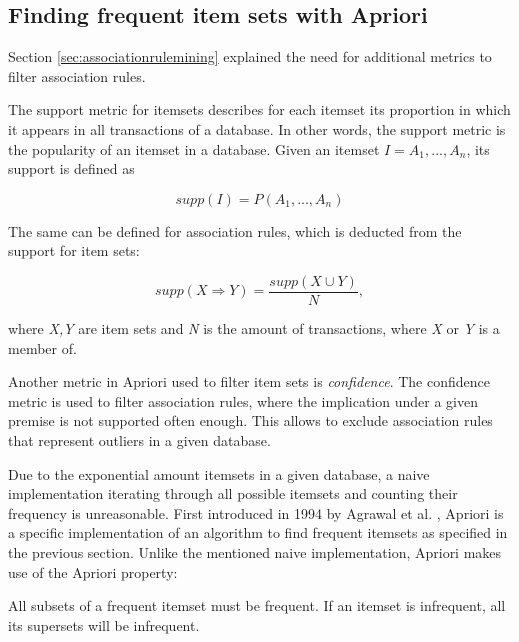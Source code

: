 \documentclass[bachelor,english]{info1thesis}
\begin{document}
\subsection{Finding frequent item sets with Apriori}
\label{sec:apriori}

Section \ref{sec:associationrulemining} explained the need for additional metrics to filter association rules.

The support metric for itemsets describes for each itemset its proportion in which it appears in all transactions of a database. In other words, the support metric is the popularity of an itemset in a database.
Given an itemset $I = {A_1, ..., A_n}$, its support is defined as

	\vspace{0.2cm}
\[supp(I) = P(A_1, ..., A_n)\]
	\vspace{0.2cm}

The same can be defined for association rules, which is deducted from the support for item sets:

	\vspace{0.2cm}
\[supp(X \Rightarrow Y) = \frac{supp(X \cup Y)}{N},\]
	\vspace{0.2cm}

where \textit{X,Y} are item sets and \textit{N} is the amount of transactions, where \textit{X} or \textit{Y} is a member of.

Another metric in Apriori used to filter item sets is \textit{confidence}. The confidence metric is used to filter association rules, where the implication under a given premise is not supported often enough. This allows to exclude association rules that represent outliers in a given database. 

Due to the exponential amount itemsets in a given database, a naive implementation iterating through all possible itemsets and counting their frequency is unreasonable.
First introduced in 1994 by Agrawal et al. \cite{agrawal1994fast}, Apriori is a specific implementation of an algorithm to find frequent itemsets as specified in the previous section. Unlike the mentioned naive implementation, Apriori makes use of the Apriori property:

\begin{definition}
	\vspace{0.5cm}
	All subsets of a frequent itemset must be frequent.
	If an itemset is infrequent, all its supersets will be infrequent.
	\vspace{0.5cm} 
\end{definition}	
\end{document}
